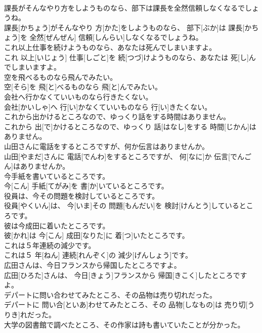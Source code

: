\documentclass[8pt]{extreport}
\begin{document}
\begin{CJK}{UTF8}{min}
\\	課長がそんなやり方をしようものなら、部下は課長を全然信頼しなくなるでしょうね。	
\\	課長[かちょう]がそんなやり 方[かた]をしようものなら、 部下[ぶか]は 課長[かちょう]を 全然[ぜんぜん] 信頼[しんらい]しなくなるでしょうね。	
\\	これ以上仕事を続けようものなら、あなたは死んでしまいますよ。	
\\	これ 以上[いじょう] 仕事[しごと]を 続[つづ]けようものなら、あなたは 死[し]んでしまいますよ。	
\\	空を飛べるものなら飛んでみたい。	
\\	空[そら]を 飛[と]べるものなら 飛[と]んでみたい。	
\\	会社へ行かなくていいものなら行きたくない。	
\\	会社[かいしゃ]へ 行[い]かなくていいものなら 行[い]きたくない。	
\\	これから出かけるところなので、ゆっくり話をする時間はありません。	
\\	これから 出[で]かけるところなので、ゆっくり 話[はなし]をする 時間[じかん]はありません。	
\\	山田さんに電話をするところですが、何か伝言はありませんか。	
\\	山田[やまだ]さんに 電話[でんわ]をするところですが、 何[なに]か 伝言[でんごん]はありませんか。	
\\	今手紙を書いているところです。	
\\	今[こん] 手紙[てがみ]を 書[か]いているところです。	
\\	役員は、今その問題を検討しているところです。	
\\	役員[やくいん]は、 今[いま]その 問題[もんだい]を 検討[けんとう]しているところです。	
\\	彼は今成田に着いたところです。	
\\	彼[かれ]は 今[こん] 成田[なりた]に 着[つ]いたところです。	
\\	これは５年連続の減少です。	
\\	これは５ 年[ねん] 連続[れんぞく]の 減少[げんしょう]です。	
\\	広田さんは、今日フランスから帰国したところですよ。	
\\	広田[ひろた]さんは、 今日[きょう]フランスから 帰国[きこく]したところですよ。	
\\	デパートに問い合わせてみたところ、その品物は売り切れだった。	
\\	デパートに 問い合[といあ]わせてみたところ、その 品物[しなもの]は 売り切[うりき]れだった。	
\\	大学の図書館で調べたところ、その作家は詩も書いていたことが分かった。	

\end{CJK}
\end{document}
